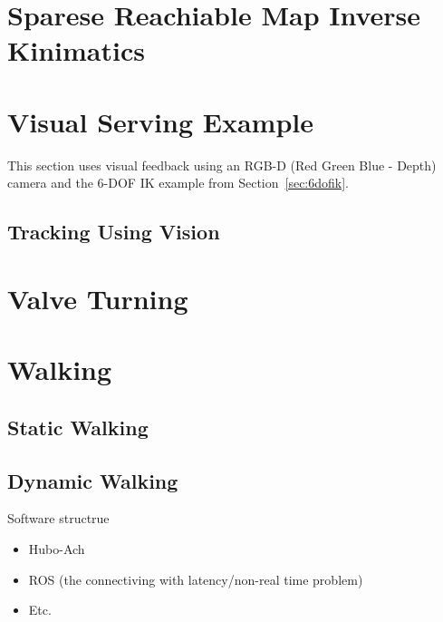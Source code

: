 \section{Sparese Reachiable Map Inverse Kinimatics}\label{sec:srm}
		
		


\section{Visual Serving Example}
This section uses visual feedback using an RGB-D (Red Green Blue - Depth) camera and the 6-DOF IK example from Section~\ref{sec:6dofik}.
	\subsection{Tracking Using Vision}
		
		

\section{Valve Turning}
	

\section{Walking}
	
	\subsection{Static Walking}\label{sec:staticWalking}
		
	\subsection{Dynamic Walking}\label{sec:dynamicWalking}
		









Software structrue
\begin{itemize}
\item Hubo-Ach
\item ROS (the connectiving with latency/non-real time problem)

\item Etc.
\end{itemize}







